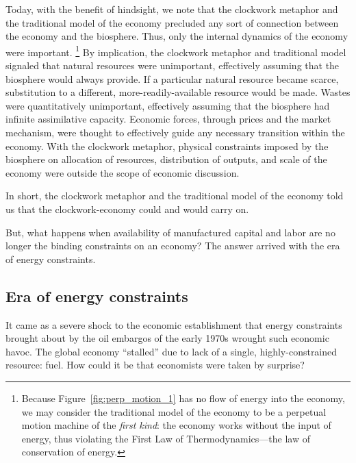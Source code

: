 Today, with the benefit of hindsight, 
we note that the clockwork metaphor and the traditional model of the economy
precluded any sort of connection 
between the economy and the biosphere.
Thus, only the internal dynamics of the economy were important.%
	\footnote{
	Because Figure~\ref{fig:perp_motion_1} has no flow of energy
	into the economy,
	we may consider the traditional model of the economy 
	to be a perpetual motion machine of the \emph{first kind}:
	the economy works without the input of energy, thus violating
	the First Law of Thermodynamics---the 
	law of conservation of energy.\cite{Rao2004}	
	}
By implication, the clockwork metaphor and traditional model 
signaled that natural resources were unimportant, 
effectively assuming that the biosphere would always provide.
If a particular natural resource became scarce, 
substitution to a different, more-readily-available resource would be made.
Wastes were quantitatively unimportant, 
effectively assuming that the biosphere had infinite assimilative capacity.
Economic forces,
through prices and the market mechanism,
were thought to effectively guide any necessary transition
within the economy.
With the clockwork metaphor, physical constraints 
imposed by the biosphere 
on allocation of resources, distribution of outputs, and 
scale of the economy 
were outside the scope of economic discussion.\cite{Daly1995}

In short, the clockwork metaphor and the traditional model of the economy 
told us that the clockwork-economy could and would carry on.

But, what happens when availability of manufactured capital and labor are no longer
the binding constraints on an economy?
The answer arrived with the era of energy constraints.


\subsection{Era of energy constraints}
\label{sec:era_of_energy_constraints}

It came as a severe shock to the economic establishment
that energy constraints brought about by the oil embargos of the early 1970s
wrought such economic havoc.\cite[p. 3]{ayres1997}
The global economy
``stalled'' due to lack of 
a single, highly-constrained resource:
fuel.
How could it be that economists were taken by surprise?

